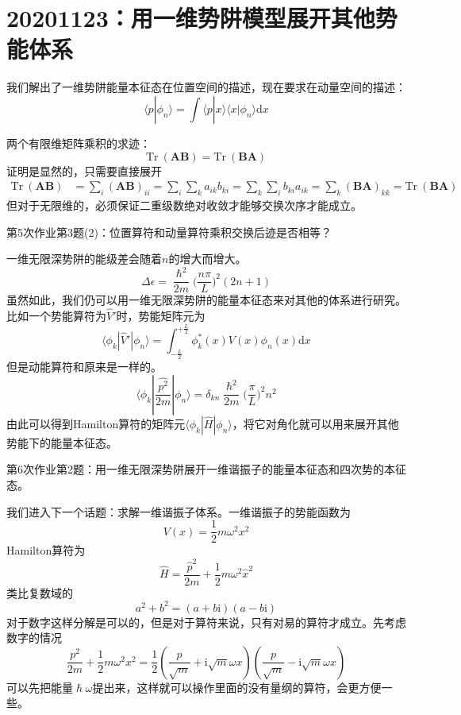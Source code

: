     \section{20201123：用一维势阱模型展开其他势能体系}
        我们解出了一维势阱能量本征态在位置空间的描述，现在要求在动量空间的描述：
        \[ \langle p|\phi_n \rangle = \int \langle p|x \rangle \langle x |\phi_n \rangle \mathrm{d}x \]

        两个有限维矩阵乘积的求迹：
        \begin{equation}
            \mathrm{Tr} \ (\bm{AB}) = \mathrm{Tr} \ (\bm{BA})
        \end{equation}
        证明是显然的，只需要直接展开
        \begin{equation}\begin{aligned}
            \mathrm{Tr} \ (\bm{AB}) &= \sum_i (\bm{AB})_{ii}
            = \sum_i \sum_k a_{ik}b_{ki}
            = \sum_k \sum_i b_{ki}a_{ik}
            = \sum_k \bm{(BA)}_{kk}
            = \mathrm{Tr} \ (\bm{BA})
        \end{aligned}\end{equation}
        但对于无限维的，必须保证二重级数绝对收敛才能够交换次序才能成立。
        \begin{asg}
            第5次作业第3题(2)：位置算符和动量算符乘积交换后迹是否相等？
        \end{asg}

        一维无限深势阱的能级差会随着$n$的增大而增大。
        \[ \Delta \epsilon = \frac {\hslash^2}{2m} \bigg(\frac {n\pi}L \bigg)^2 (2n+1) \]
        虽然如此，我们仍可以用一维无限深势阱的能量本征态来对其他的体系进行研究。比如一个势能算符为$\hat{V}'$时，势能矩阵元为
        \[
            \langle \phi_k | \hat{V}' | \phi_n \rangle = \int_{-\frac L2}^{+\frac L2} \phi_k^*(x) V(x) \phi_n(x) \mathrm{d}x 
        \]
        但是动能算符和原来是一样的。
        \[
            \langle \phi_k | \frac {\hat{p^2}}{2m} | \phi_n \rangle = \delta_{kn} \frac {\hslash^2}{2m} \bigg( \frac {\pi}L \bigg)^2 n^2
        \]
        由此可以得到Hamilton算符的矩阵元$\langle \phi_k | \hat{H} | \phi_n \rangle$，将它对角化就可以用来展开其他势能下的能量本征态。
        \begin{asg}
            第6次作业第2题：用一维无限深势阱展开一维谐振子的能量本征态和四次势的本征态。
        \end{asg}

        我们进入下一个话题：求解一维谐振子体系。一维谐振子的势能函数为
        \[ V(x) = \frac 12 m\omega^2x^2 \]
        Hamilton算符为
        \[ \hat{H} = \frac {\hat{p}^2}{2m} + \frac 12 m\omega^2 \hat{x}^2 \]
        类比复数域的
        \[ a^2 + b^2 = (a+b\mathrm{i})(a-b\mathrm{i}) \]
        对于数字这样分解是可以的，但是对于算符来说，只有对易的算符才成立。先考虑数字的情况
        \[ \frac {p^2}{2m} + \frac 12 m\omega^2 x^2 = \frac 12 (\frac p{\sqrt{m}} + \mathrm{i}\sqrt{m}\omega x)(\frac p{\sqrt{m}} - \mathrm{i}\sqrt{m}\omega x) \]
        可以先把能量$\hslash \omega$提出来，这样就可以操作里面的没有量纲的算符，会更方便一些。

